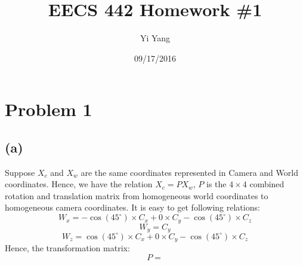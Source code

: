 \documentclass[letterpaper]{article}
\author{Yi Yang}
\title{EECS 442 Homework \#1}
\begin{document}
\date{09/17/2016}
\maketitle

\newcommand{\trace}{\mathrm{trace}}
\newcommand{\real}{\mathbb R}  %
\newcommand{\nat}{\mathbb N}   %
\newcommand{\cp}{\mathbb C}    %
\newcommand{\ds}{\displaystyle}
\newcommand{\mf}[2]{\frac{\ds #1}{\ds #2}}
\newcommand{\spanof}[1]{\textrm{span} \{ #1 \}}
\newcommand{\sol}[0]{\textbf{Solution: }}
\newcommand{\pf}[0]{\textbf{Proof:}}
\newcommand{\rme}[0]{\textrm{e}}
\newcommand{\Null}[1]{\textrm{Null}\{#1\}}
\parindent 0pt
\section*{Problem 1}
\subsection*{(a)}
Suppose $X_c$ and $X_w$ are the same coordinates represented in Camera and World coordinates. Hence, we have the relation $X_c = PX_w$, $P$ is the $4\times4$ combined rotation and translation matrix from homogeneous world coordinates to homogeneous camera coordinates. It is easy to get following relations:
$$W_x = -\cos(45^{\circ})\times C_x + 0\times C_y - \cos(45^{\circ})\times C_z$$
$$W_y = C_y$$
$$W_z = \cos(45^{\circ})\times C_x + 0\times C_y - \cos(45^{\circ})\times C_z$$
Hence, the transformation matrix:
$$P = $$
\end{document}
